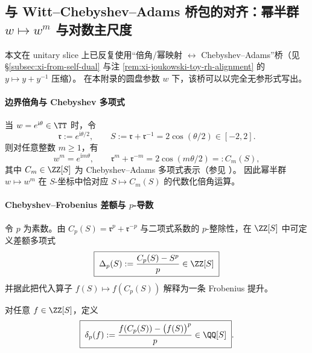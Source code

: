 \subsection{与 Witt--Chebyshev--Adams 桥包的对齐：幂半群 \texorpdfstring{$w\mapsto w^m$}{w->w(m)} 与对数主尺度}\label{subsec:unit-disk-witt-chebyshev}
本文在 unitary slice 上已反复使用“倍角/幂映射 \(\leftrightarrow\) Chebyshev--Adams”桥（见 \S\ref{subsec:xi-from-self-dual} 与注 \ref{rem:xi-joukowski-toy-rh-alignment} 的 \(y\mapsto y+y^{-1}\) 压缩）。
在本附录的圆盘参数 \(w\) 下，该桥可以以完全无参形式写出。

\paragraph{边界倍角与 Chebyshev 多项式}
当 \(w=e^{\mathrm{i}\theta}\in\TT\) 时，令
\[
\mathfrak{r}:=e^{\mathrm{i}\theta/2},\qquad S:=\mathfrak{r}+\mathfrak{r}^{-1}=2\cos(\theta/2)\in[-2,2].
\]
则对任意整数 \(m\ge 1\)，有
\[
w^m=e^{\mathrm{i}m\theta},\qquad
\mathfrak{r}^m+\mathfrak{r}^{-m}=2\cos(m\theta/2)=:C_m(S),
\]
其中 \(C_m\in\ZZ[S]\) 为 Chebyshev--Adams 多项式表示（参见 \cite{MasonHandscomb2003Chebyshev}）。
因此幂半群 \(w\mapsto w^m\) 在 \(S\)-坐标中恰对应 \(S\mapsto C_m(S)\) 的代数化倍角运算。

\paragraph{Chebyshev--Frobenius 差额与 \texorpdfstring{$p$}{p}-导数}
令 \(p\) 为素数。由 \(C_p(S)=\mathfrak{r}^p+\mathfrak{r}^{-p}\) 与二项式系数的 \(p\)-整除性，在 \(\ZZ[S]\) 中可定义差额多项式
\begin{equation}\label{eq:chebyshev-frobenius-delta-poly}
\boxed{\;\Delta_p(S):=\frac{C_p(S)-S^p}{p}\in\ZZ[S]\;}
\end{equation}
并据此把代入算子 \(f(S)\mapsto f(C_p(S))\) 解释为一条 Frobenius 提升。

\begin{definition}\label{def:chebyshev-frobenius-pderivation}
对任意 \(f\in\ZZ[S]\)，定义
\begin{equation}\label{eq:chebyshev-frobenius-pderivation}
\boxed{\;
\delta_p(f):=\frac{f(C_p(S))-\bigl(f(S)\bigr)^p}{p}\in\QQ[S]\; }.
\end{equation}
\end{definition}

